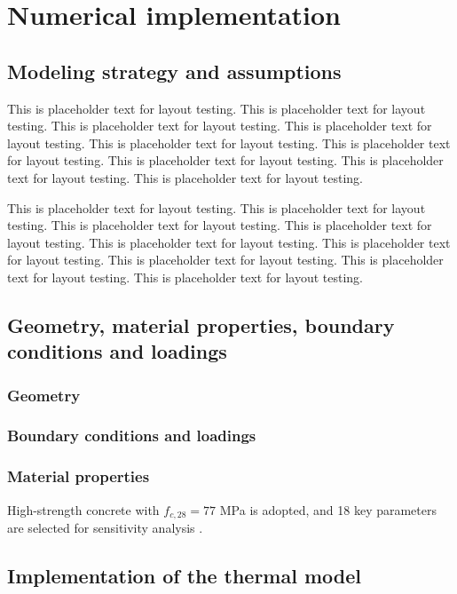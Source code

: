 \documentclass[a4paper,12pt,twoside]{report}     %
\begin{document}

\cleardoublepage
\chapter{Numerical implementation}

\section{Modeling strategy and assumptions}
This is placeholder text for layout testing. This is placeholder text for layout testing. This is placeholder text for layout testing. This is placeholder text for layout testing. This is placeholder text for layout testing. This is placeholder text for layout testing. This is placeholder text for layout testing. This is placeholder text for layout testing. This is placeholder text for layout testing.

This is placeholder text for layout testing. This is placeholder text for layout testing. This is placeholder text for layout testing. This is placeholder text for layout testing. This is placeholder text for layout testing. This is placeholder text for layout testing. This is placeholder text for layout testing. This is placeholder text for layout testing. This is placeholder text for layout testing.

\section{Geometry, material properties, boundary conditions and loadings}

\subsection{Geometry}

\subsection{Boundary conditions and loadings}

\subsection{Material properties}
High-strength concrete with $f_{c,28} = 77$ MPa is adopted, and 18 key parameters are selected for sensitivity analysis \cite{liu_stochastic_2001}.

\section{Implementation of the thermal model}
\end{document}
